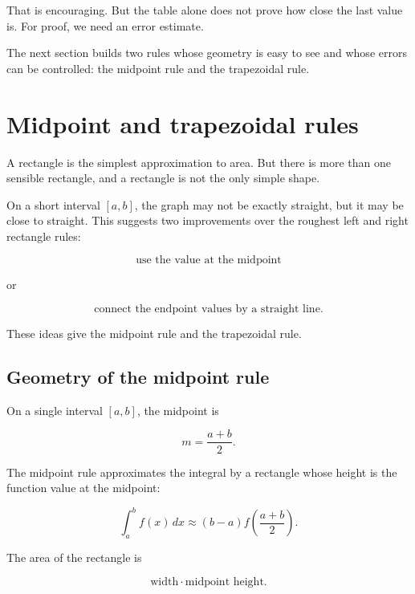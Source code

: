 That is encouraging.  But the table alone does not prove how close the last value is.
For proof, we need an error estimate.

The next section builds two rules whose geometry is easy to see and whose errors can be
controlled: the midpoint rule and the trapezoidal rule.

\section{Midpoint and trapezoidal rules}
\label{sec:midpoint-trapezoidal-rules}

A rectangle is the simplest approximation to area.  But there is more than one sensible
rectangle, and a rectangle is not the only simple shape.

On a short interval \([a,b]\), the graph may not be exactly straight, but it may be close to
straight.  This suggests two improvements over the roughest left and right rectangle
rules:

\[
\text{use the value at the midpoint}
\]

or

\[
\text{connect the endpoint values by a straight line}.
\]

These ideas give the midpoint rule and the trapezoidal rule.

\subsection{Geometry of the midpoint rule}
\label{subsec:geometry-midpoint-rule}

On a single interval \([a,b]\), the midpoint is

\[
m=\frac{a+b}{2}.
\]

The midpoint rule approximates the integral by a rectangle whose height is the function
value at the midpoint:

\[
\boxed{
\int_a^b f(x)\,dx\approx (b-a)f\left(\frac{a+b}{2}\right).
}
\]

The area of the rectangle is

\[
\text{width}\cdot\text{midpoint height}.
\]

